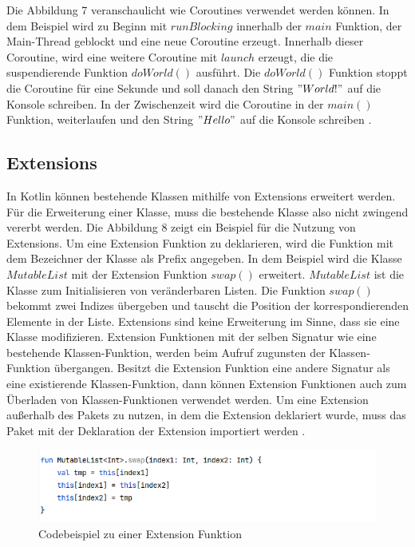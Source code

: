 \documentclass{article}
\begin{document}
Die Abbildung 7 veranschaulicht wie Coroutines verwendet werden können. In dem Beispiel wird zu Beginn mit $runBlocking$ innerhalb der $main$ Funktion, der Main-Thread geblockt und eine neue Coroutine erzeugt. Innerhalb dieser Coroutine, wird eine weitere Coroutine mit $launch$ erzeugt, die die suspendierende Funktion $doWorld()$ ausführt. Die $doWorld()$ Funktion stoppt die Coroutine für eine Sekunde und soll danach den String $"World!"$ auf die Konsole schreiben. In der Zwischenzeit wird die Coroutine in der $main()$ Funktion, weiterlaufen und den String $"Hello"$ auf die Konsole schreiben \cite{KotlinLangDocCoroutines}.
\subsection{Extensions}
In Kotlin können bestehende Klassen mithilfe von Extensions erweitert werden. Für die Erweiterung einer Klasse, muss die bestehende Klasse also nicht zwingend vererbt werden. Die Abbildung 8 zeigt ein Beispiel für die Nutzung von Extensions.  Um eine Extension Funktion zu deklarieren, wird die Funktion mit dem Bezeichner der Klasse als Prefix angegeben. In dem Beispiel wird die Klasse $MutableList$ mit der Extension Funktion $swap()$ erweitert. $MutableList$ ist die Klasse zum Initialisieren von veränderbaren Listen. Die Funktion $swap()$ bekommt zwei Indizes übergeben und tauscht die Position der korrespondierenden Elemente in der Liste. \newline
Extensions sind keine Erweiterung im Sinne, dass sie eine Klasse modifizieren. Extension Funktionen mit der selben Signatur wie eine bestehende Klassen-Funktion, werden beim Aufruf zugunsten der Klassen-Funktion übergangen. Besitzt die Extension Funktion eine andere Signatur als eine existierende Klassen-Funktion, dann können Extension Funktionen auch zum Überladen von Klassen-Funktionen verwendet werden. Um eine Extension außerhalb des Pakets zu nutzen, in dem die Extension deklariert wurde, muss das Paket mit der Deklaration der Extension importiert werden \cite{KotlinLangDocExtensions}.
\begin{figure}[!htb]
    \raggedright
    \includegraphics[width=\columnwidth]{img/extension.png}
    \caption{Codebeispiel zu einer Extension Funktion\footnotemark}
\end{figure}
\end{document}
